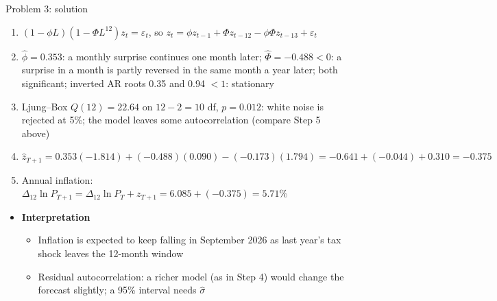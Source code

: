 \begin{frame}{Problem 3: solution}
\itemsize{\footnotesize}
\begin{enumerate}
    \item $(1 - \phi L)(1 - \Phi L^{12})z_t = \varepsilon_t$, so $z_t = \phi z_{t-1} + \Phi z_{t-12} - \phi\Phi z_{t-13} + \varepsilon_t$
    \item $\hat\phi = 0.353$: a monthly surprise continues one month later; $\hat\Phi = \ensuremath{-}0.488 < 0$: a surprise in a month is partly reversed in the same month a year later; both significant; inverted AR roots 0.35 and 0.94 $< 1$: stationary
    \item Ljung--Box $Q(12) = 22.64$ on $12 - 2 = 10$ df, $p = 0.012$: white noise is rejected at 5\%; the model leaves some autocorrelation (compare Step 5 above)
    \item $\hat z_{T+1} = 0.353(\ensuremath{-}1.814) + (\ensuremath{-}0.488)(0.090) - (\ensuremath{-}0.173)(1.794) = \ensuremath{-}0.641 + (\ensuremath{-}0.044) + 0.310 = \ensuremath{-}0.375$
    \item Annual inflation: $\Delta_{12}\ln P_{T+1} = \Delta_{12}\ln P_T + z_{T+1} = 6.085 + (\ensuremath{-}0.375) = 5.71\%$
\end{enumerate}
\begin{itemize}
    \item \textbf{Interpretation}
    \begin{itemize}
        \item Inflation is expected to keep falling in September 2026 as last year's tax shock leaves the 12-month window
        \item Residual autocorrelation: a richer model (as in Step 4) would change the forecast slightly; a 95\% interval needs $\hat\sigma$
    \end{itemize}
\end{itemize}
\end{frame}

